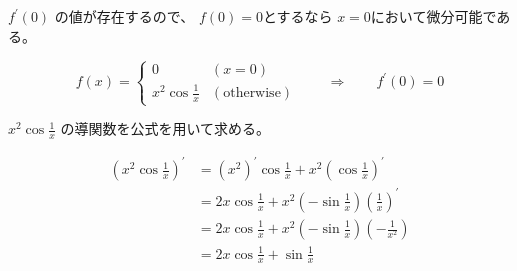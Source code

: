 \documentclass[12pt,b5paper]{ltjsarticle}
\begin{document}
$f^{\prime}(0)$
の値が存在するので、
$f(0)=0$とするなら
$x=0$において微分可能である。

\begin{equation}
 f(x)=
 \begin{cases}
  0 & (x=0)\\
  x^{2}\cos{\frac{1}{x}} & (\text{otherwise})
 \end{cases}
\qquad
\Longrightarrow
\qquad
f^{\prime}(0)=0
\end{equation}

\hrulefill
\dotfill
\hrulefill
\dotfill
\hrulefill

$x^{2}\cos{\frac{1}{x}}$
の導関数を公式を用いて求める。

\begin{align}
 \left(x^{2}\cos{\frac{1}{x}}\right)^{\prime}
  & =
  (x^{2})^{\prime}\cos{\frac{1}{x}}
  +
  x^{2} \left( \cos{\frac{1}{x}} \right)^{\prime}\\
  & =
  2x\cos{\frac{1}{x}}
  +
  x^{2} \left(- \sin{\frac{1}{x}} \right) \left(\frac{1}{x}\right)^{\prime}\\
  & =
  2x\cos{\frac{1}{x}}
  +
  x^{2} \left(- \sin{\frac{1}{x}} \right) \left(-\frac{1}{x^{2}}\right)\\
  & =
  2x\cos{\frac{1}{x}}
  + \sin{\frac{1}{x}}
\end{align}
\end{document}
